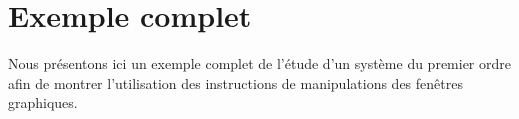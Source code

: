\section{Exemple complet}
Nous présentons ici un exemple complet de l'étude d'un système du premier ordre
afin de montrer l'utilisation des instructions de manipulations des fenêtres
graphiques.
